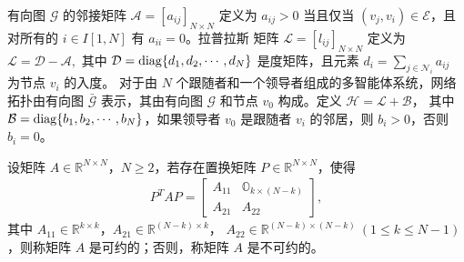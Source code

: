 有向图 $\mathcal{G}$ 的邻接矩阵 $\mathcal{A}=[a_{ij}]_{N\times N}$ 定义为 $a_{ij}>0$ 当且仅当 $(v_j,v_i)\in\mathcal{E}$，且对所有的 $ i\in I[1,N]$ 有 $a_{ii}=0$。拉普拉斯 
矩阵 $\mathcal{L}=[l_{ij}]_{N\times N}$ 定义为 $\mathcal{L}=\mathcal{D}-\mathcal{A},$ 其中 $\mathcal{D}={\rm diag}\{d_1,d_2,\cdots,d_N\}$ 是度矩阵，且元素 
$d_i=\sum\limits_{j\in \mathcal{N}_i}a_{ij}$ 为节点 $v_i$ 的入度。  对于由 $N$ 个跟随者和一个领导者组成的多智能体系统，网络拓扑由有向图 $\bar{\mathcal{G}}$ 表示，其由有向图 $\mathcal{G}$ 和节点 $v_0$ 构成。定义 $\mathcal{H}=\mathcal{L}+\mathcal{B}$， 其中 $\mathcal{B}={\rm diag}\{b_1,b_2,\cdots,b_N\}$，如果领导者 $v_0$ 是跟随者 $v_i$ 的邻居，则 $b_i>0$，否则 $b_{i}=0$。
\begin{definition} \cite{2011DistributedLondon} 
设矩阵 $A\in\mathbb{R}^{N\times N}$，$N\geq 2$，若存在置换矩阵 $P\in\mathbb{R}^{N\times N}$，使得
 \begin{align*}P^T AP=
\left[ \begin{array}{cc } 
A_{11} & \mathbb{O}_{k\times (N-k)}\\
A_{21} &A_{22}
\end{array}\right], 
\end{align*}
其中 $A_{11}\in\mathbb{R}^{k\times k}$，$A_{21}\in\mathbb{R}^{(N-k)\times k}$， $A_{22}\in\mathbb{R}^{(N-k)\times (N-k)}\ (1\leq k\leq N-1)$，则称矩阵 $A$ 是可约的；否则，称矩阵 $A$ 是不可约的。 
\end{definition} 

